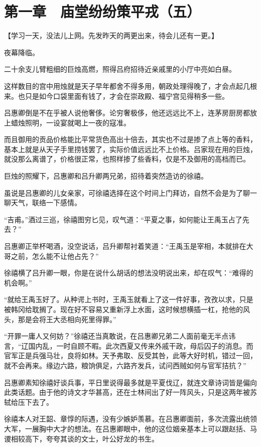 \section{第一章　庙堂纷纷策平戎（五）}

【学习一天，没法儿上网。先发昨天的两更出来，待会儿还有一更。】

夜幕降临。

二十余支儿臂粗细的巨烛高燃，照得吕府招待近亲戚里的小厅中亮如白昼。

这样数目的宫中用烛就是天子早年都舍不得多用，朝政处理得晚了，才会点起几根来。也只是如今口袋里面有钱了，才会在崇政殿、福宁宫见得稍多一些。

吕惠卿倒是不在乎被人说他奢侈。论穷奢极侈，他还远远比不上，连茅房厨房都放上蜡烛照明，一设宴就喝上一夜的寇准。

而且御用的贡品价格能比平常货色高出十倍去，其实也不过是掺了点上等的香料，基本上就是从天子手里捞钱罢了，实际价值远远比不上价格。吕家现在用的巨烛，就没那么离谱了，价格很正常，也照样掺了些香料，仅是不及御用的高档而已。

巨烛的照耀下，吕惠卿和吕升卿两兄弟，招待着突然造访的徐禧。

虽说是吕惠卿的儿女亲家，可徐禧选择在这个时间上门拜访，自然不会是为了聊一聊天气，联络一下感情。

“吉甫。”酒过三巡，徐禧图穷匕见，叹气道：“平夏之事，如何能让王禹玉占了先去？”

吕惠卿正举杯喝酒，没空说话，吕升卿帮衬着笑道：“王禹玉是宰相，本就排在大哥之前，怎么能不让他占先？”

徐禧横了吕升卿一眼，你是在说什么胡话的想法没明说出来，却在叹气：“难得的机会啊。”

“就给王禹玉好了。从种谔上书时，王禹玉就看上了这一件好事，孜孜以求，只是被韩冈给耽搁了。现在好不容易又重新浮上水面，这时候想横插一杠，抢他的风头，那是会将王大丞相向死里得罪。”

“开罪一庸人又何妨？”徐禧还当真敢说，在吕惠卿兄弟二人面前毫无半点讳言，“辽国内乱，一时自顾不暇。此次西夏又传来外戚干政，母后囚子的消息。而官军正是兵强马壮，良将如林。天予弗取、反受其咎，此等大好时机，错过一回，就不会再来。缘边六路，粮饷俱足，六路齐发兵，试问西贼如何与官军拮抗？”

吕惠卿素知徐禧好谈兵事，平日里说得最多就是平夏伐辽，就连文章诗词皆是偏向此类话题。由于他的诗文才华甚高，还在士林间出了好一阵风头，只是这两年被苏轼给压下去了。

徐禧本人对王韶、章惇的际遇，没有少嫉妒羡慕。在吕惠卿面前，多次流露出统领大军，一展胸中大才的想法。在吕惠卿眼中，他的这位姻亲基本上可以跟赵括、马谡相较高下，夸夸其谈的文士，叶公好龙的书生。

